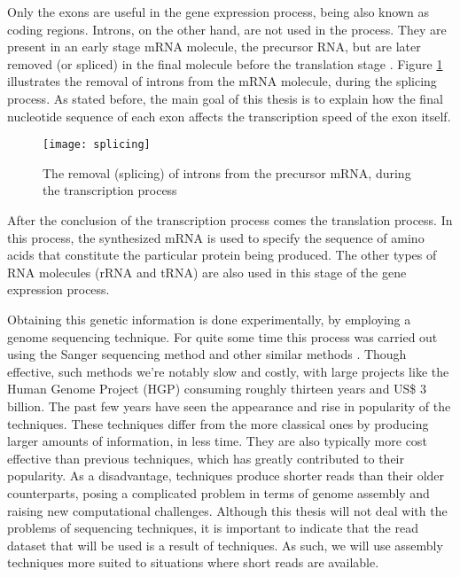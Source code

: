 Only the exons are useful in the gene expression process, being also known as
coding regions. Introns, on the other hand, are not used in the process. They
are present in an early stage mRNA molecule, the precursor RNA, but are later
removed (or spliced) in the final molecule before the translation stage
\cite{leic:gene_expr}. Figure \ref{fig:splicing} illustrates the removal of
introns from the mRNA molecule, during the  splicing process. As stated before,
the main goal of this thesis is to explain how the final nucleotide sequence of
each exon affects the transcription speed of the exon itself.

\begin{figure}[!htb]
  \begin{center}
    \leavevmode
    \texttt{[image: splicing]}
    \caption{The removal (splicing) of introns from the precursor mRNA, during
    the transcription process}
    \label{fig:splicing}
  \end{center}
\end{figure}

After the conclusion of the transcription process comes the translation process.
In this process, the synthesized mRNA is used to specify the sequence of amino
acids that constitute the particular protein being produced. The other types of
RNA molecules (rRNA and tRNA) are also used in this stage of the gene expression
process.

Obtaining this genetic information is done experimentally, by employing a genome
sequencing technique. For quite some time this process was carried out using the
Sanger sequencing method and other similar methods \cite{Reis-Filho2009}. Though
effective, such methods we're notably slow and costly, with large projects like
the Human Genome Project (HGP) consuming roughly thirteen years and US\$ 3
billion. The past few years have seen the appearance and rise in popularity of
the \ngs{} techniques. These techniques differ from the more classical ones by
producing larger amounts of information, in less time. They are also typically
more cost effective than previous techniques, which has greatly contributed to
their popularity. As a disadvantage, \ngs{} techniques produce shorter reads
than their older counterparts, posing a complicated problem in terms of genome
assembly and raising new computational challenges. Although this thesis will not
deal with the problems of sequencing techniques, it is important to indicate
that the read dataset that will be used is a result of \ngs{} techniques. As
such, we will use assembly techniques more suited to situations where short
reads are available.

